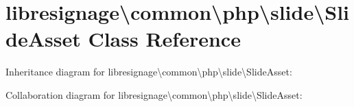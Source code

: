 \hypertarget{classlibresignage_1_1common_1_1php_1_1slide_1_1SlideAsset}{}\section{libresignage\textbackslash{}common\textbackslash{}php\textbackslash{}slide\textbackslash{}Slide\+Asset Class Reference}
\label{classlibresignage_1_1common_1_1php_1_1slide_1_1SlideAsset}


Inheritance diagram for libresignage\textbackslash{}common\textbackslash{}php\textbackslash{}slide\textbackslash{}Slide\+Asset\+:


Collaboration diagram for libresignage\textbackslash{}common\textbackslash{}php\textbackslash{}slide\textbackslash{}Slide\+Asset\+:
